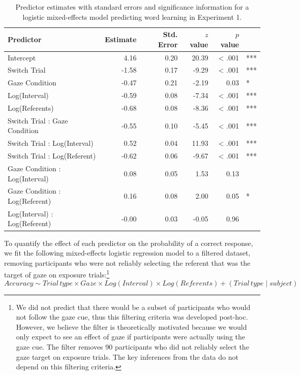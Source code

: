 \documentclass[a4paper,man,floatsintext]{apa6}
\begin{document}
\begin{table}[ht]
\centering
\caption{Predictor estimates with standard errors and significance information for a logistic mixed-effects model predicting word learning in Experiment 1.} 
\label{tab:exp1_reg}
\begin{tabular}{lrrrrl}
 Predictor & Estimate & Std. Error & $z$ value & $p$ value &  \\ 
  \hline
Intercept & 4.16 & 0.20 & 20.39 & < .001 & *** \\ 
  Switch Trial & -1.58 & 0.17 & -9.29 & < .001 & *** \\ 
  Gaze Condition & -0.47 & 0.21 & -2.19 & 0.03 & * \\ 
  Log(Interval) & -0.59 & 0.08 & -7.34 & < .001 & *** \\ 
  Log(Referents) & -0.68 & 0.08 & -8.36 & < .001 & *** \\ 
  Switch Trial : Gaze Condition & -0.55 & 0.10 & -5.45 & < .001 & *** \\ 
  Switch Trial : Log(Interval) & 0.52 & 0.04 & 11.93 & < .001 & *** \\ 
  Switch Trial : Log(Referent) & -0.62 & 0.06 & -9.67 & < .001 & *** \\ 
  Gaze Condition : Log(Interval) & 0.08 & 0.05 & 1.53 & 0.13 &  \\ 
  Gaze Condition : Log(Referent) & 0.16 & 0.08 & 2.00 & 0.05 & * \\ 
  Log(Interval) : Log(Referent) & -0.00 & 0.03 & -0.05 & 0.96 &  \\ 
   \hline
\end{tabular}
\end{table}

To quantify the effect of each predictor on the probability of a correct
response, we fit the following mixed-effects logistic regression model
to a filtered dataset, removing participants who were not reliably
selecting the referent that was the target of gaze on exposure
trials:\footnote{We did not predict that there would be a subset of participants who would not follow the gaze cue, thus this filtering criteria was developed post-hoc. However, we believe the filter is theoretically motivated because we would only expect to see an effect of gaze if participants were actually using the gaze cue. The filter removes 90 participants who did not reliably select the gaze target on exposure trials. The key inferences from the data do not depend on this filtering criteria.}
\[Accuracy \sim Trial \, type \times Gaze \times Log(Interval) \times Log(Referents) + (Trial \, type \mid subject)\]
\end{document}
